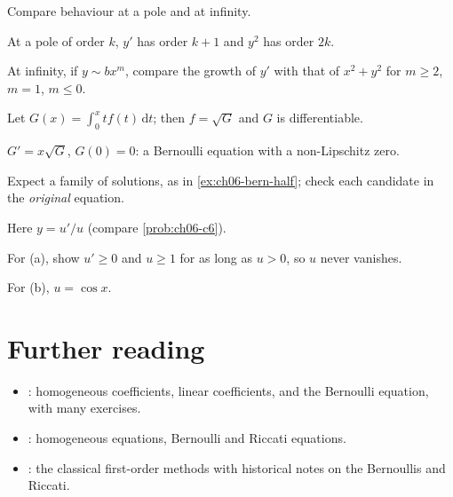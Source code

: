 \begin{hintlevels}
  \item Compare behaviour at a pole and at infinity.
  \item At a pole of order $k$, $y'$ has order $k+1$ and $y^2$ has order $2k$.
  \item At infinity, if $y\sim bx^m$, compare the growth of $y'$ with that of
        $x^2 + y^2$ for $m\ge2$, $m = 1$, $m\le0$.
\end{hintlevels}

\begin{hintlevels}
  \item Let $G(x) = \int_0^xtf(t)\,\mathrm{d}t$; then $f = \sqrt G$ and $G$ is
        differentiable.
  \item $G' = x\sqrt G$, $G(0) = 0$: a Bernoulli equation with a non-Lipschitz
        zero.
  \item Expect a family of solutions, as in \cref{ex:ch06-bern-half}; check
        each candidate in the \emph{original} equation.
\end{hintlevels}

\begin{hintlevels}
  \item Here $y = u'/u$ (compare \cref{prob:ch06-c6}).
  \item For (a), show $u'\ge0$ and $u\ge1$ for as long as $u>0$, so $u$ never
        vanishes.
  \item For (b), $u = \cos x$.
\end{hintlevels}

\section{Further reading}\label{sec:ch06-reading}

\begin{itemize}
  \item \textcite[Lessons 7, 8, 11]{TenenbaumPollard}: homogeneous coefficients,
        linear coefficients, and the Bernoulli equation, with many exercises.
  \item \textcite[\S2.2 and the problems of \S2.4]{BoyceDiPrima}: homogeneous
        equations, Bernoulli and Riccati equations.
  \item \textcite[Ch.~2]{Simmons}: the classical first-order methods with
        historical notes on the Bernoullis and Riccati.
\end{itemize}
